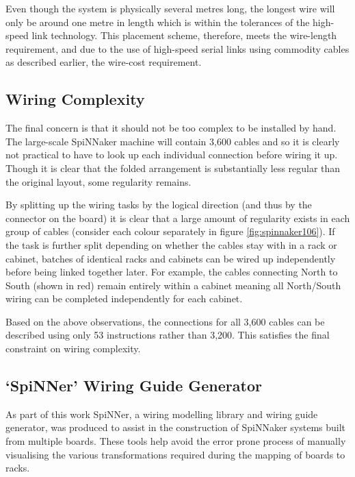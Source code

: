 			Even though the system is physically several metres long, the longest wire
			will only be around one metre in length which is within the tolerances of
			the high-speed link technology. This placement scheme, therefore, meets
			the wire-length requirement, and due to the use of high-speed serial links
			using commodity cables as described earlier, the wire-cost requirement.
			
		\subsection{Wiring Complexity}
			
			The final concern is that it should not be too complex to
			be installed by hand. The large-scale SpiNNaker machine will contain 3,600
			cables and so it is clearly not practical to have to look up each
			individual connection before wiring it up. Though it is clear that the
			folded arrangement is substantially less regular than the original layout,
			some regularity remains.
			
			By splitting up the wiring tasks by the logical direction (and thus by the
			connector on the board) it is clear that a large amount of regularity
			exists in each group of cables (consider each colour separately in figure
			\ref{fig:spinnaker106}). If the task is further split depending on whether
			the cables stay with in a rack or cabinet, batches of identical racks and
			cabinets can be wired up independently before being linked together later.
			For example, the cables connecting North to South (shown in red) remain
			entirely within a cabinet meaning all North/South wiring can be completed
			independently for each cabinet.
			
			Based on the above observations, the connections for all 3,600 cables can
			be described using only 53 instructions rather than 3,200. This satisfies
			the final constraint on wiring complexity.
		
		\subsection{`SpiNNer' Wiring Guide Generator}
			
			As part of this work SpiNNer, a wiring modelling library and wiring guide
			generator, was produced to assist in the construction of SpiNNaker systems
			built from multiple boards. These tools help avoid the error prone process
			of manually visualising the various transformations required during the
			mapping of boards to racks.
			
